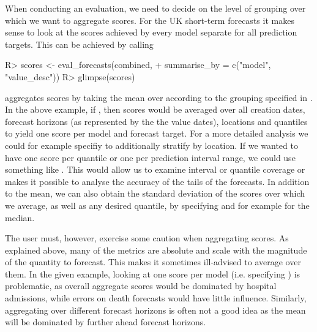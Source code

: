 \documentclass[article,shortnames]{jss}
\newcommand{\fct}[1]{\code{#1()}}
\begin{document}
When conducting an evaluation, we need to decide on the level of grouping over which we want to aggregate scores. For the UK short-term forecasts it makes sense to look at the scores achieved by every model separate for all prediction targets. This can be achieved by calling
\begin{Schunk}
\begin{Sinput}
R> scores <- eval_forecasts(combined, 
+                           summarise_by = c("model", "value_desc"))
R> glimpse(scores)
\end{Sinput}
\end{Schunk}
% 
\fct{eval\_forecasts} aggregates scores by taking the mean over according to the grouping specified in . In the above example, if , then scores would be averaged over all creation dates, forecast horizons (as represented by the the value dates), locations and quantiles to yield one score per model and forecast target. For a more detailed analysis we could for example specifiy  to additionally stratify by location. If we wanted to have one score per quantile or one per prediction interval range, we could use something like . This would allow us to examine interval or quantile coverage or makes it possible to analyse the accuracy of the tails of the forecasts. In addition to the mean, we can also obtain the standard deviation of the scores over which we average, as well as any desired quantile, by specifying  and for example  for the median. 

The user must, however, exercise some caution when aggregating scores. As explained above, many of the metrics are absolute and scale with the magnitude of the quantity to forecast. This makes it sometimes ill-advised to average over them. In the given example, looking at one score per model (i.e. specifying ) is problematic, as overall aggregate scores would be dominated by hospital admissions, while errors on death forecasts would have little influence. Similarly, aggregating over different forecast horizons is often not a good idea as the mean will be dominated by further ahead forecast horizons. 
\end{document}
